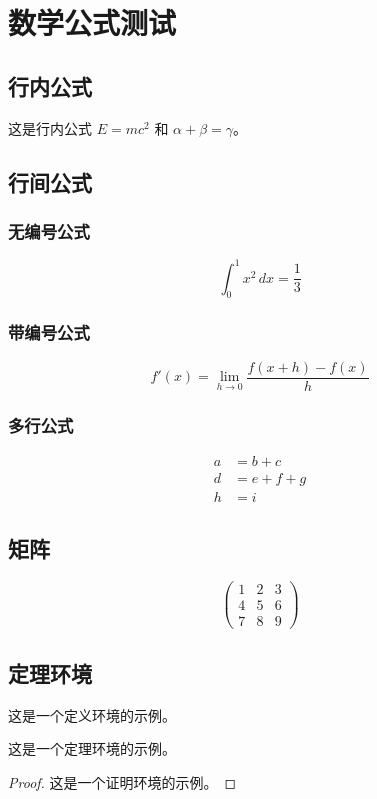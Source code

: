 \documentclass[degree=bachelor]{sduthesis}
\begin{document}
\chapter{数学公式测试}

\section{行内公式}

这是行内公式 $E = mc^2$ 和 $\alpha + \beta = \gamma$。

\section{行间公式}

\subsection{无编号公式}

\[
\int_0^1 x^2 \, dx = \frac{1}{3}
\]

\subsection{带编号公式}

\begin{equation}
  \label{eq:derivative}
  f'(x) = \lim_{h \to 0} \frac{f(x+h) - f(x)}{h}
\end{equation}

\subsection{多行公式}

\begin{align}
  a &= b + c \label{eq:align1} \\
  d &= e + f + g \label{eq:align2} \\
  h &= i \label{eq:align3}
\end{align}

\section{矩阵}

\[
\begin{pmatrix}
  1 & 2 & 3 \\
  4 & 5 & 6 \\
  7 & 8 & 9
\end{pmatrix}
\]

\section{定理环境}

\begin{definition}
  这是一个定义环境的示例。
\end{definition}

\begin{theorem}
  这是一个定理环境的示例。
\end{theorem}

\begin{proof}
  这是一个证明环境的示例。
\end{proof}
\end{document}
